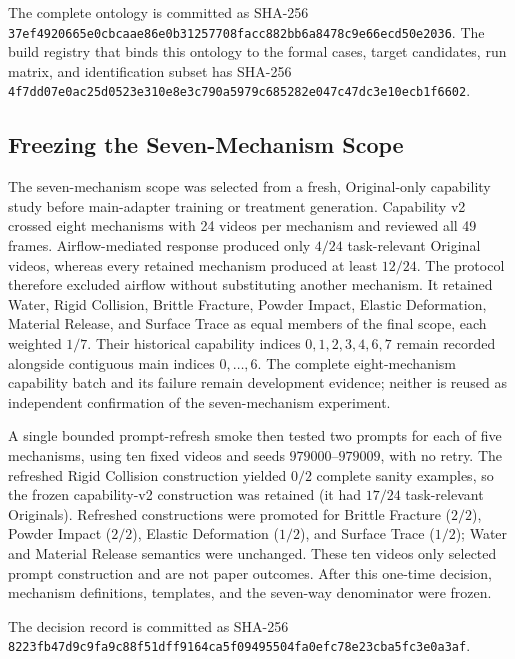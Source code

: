 {\footnotesize The complete ontology is committed as SHA-256
\texttt{37ef4920\allowbreak{}665e0cbc\allowbreak{}aae86e0b\allowbreak{}31257708\allowbreak{}facc882b\allowbreak{}b6a8478c\allowbreak{}9e66ecd5\allowbreak{}0e2036}.
The build registry that binds this ontology to the formal cases, target
candidates, run matrix, and identification subset has SHA-256
\texttt{4f7dd07e\allowbreak{}0ac25d05\allowbreak{}23e310e8\allowbreak{}e3c790a5\allowbreak{}979c6852\allowbreak{}82e047c4\allowbreak{}7dc3e10e\allowbreak{}cb1f6602}.\par}

\subsection{Freezing the Seven-Mechanism Scope}
\label{app:scope-freeze}

The seven-mechanism scope was selected from a fresh, Original-only capability
study before main-adapter training or treatment generation.  Capability v2
crossed eight mechanisms with 24 videos per mechanism and reviewed all 49
frames.  Airflow-mediated response produced only \(4/24\) task-relevant
Original videos, whereas every retained mechanism produced at least \(12/24\).
The protocol therefore excluded airflow without substituting another
mechanism.  It retained Water, Rigid Collision, Brittle Fracture, Powder
Impact, Elastic Deformation, Material Release, and Surface Trace as equal
members of the final scope, each weighted \(1/7\).  Their historical capability
indices \(0,1,2,3,4,6,7\) remain recorded alongside contiguous main indices
\(0,\ldots,6\).  The complete eight-mechanism capability batch and its failure
remain development evidence; neither is reused as independent confirmation of
the seven-mechanism experiment.

A single bounded prompt-refresh smoke then tested two prompts for each of five
mechanisms, using ten fixed videos and seeds \(979000\)--\(979009\), with no
retry.  The refreshed Rigid Collision construction yielded \(0/2\) complete
sanity examples, so the frozen capability-v2 construction was retained (it had
\(17/24\) task-relevant Originals).  Refreshed constructions were promoted for
Brittle Fracture (\(2/2\)), Powder Impact (\(2/2\)), Elastic Deformation
(\(1/2\)), and Surface Trace (\(1/2\)); Water and Material Release semantics
were unchanged.  These ten videos only selected prompt construction and are
not paper outcomes.  After this one-time decision, mechanism definitions,
templates, and the seven-way denominator were frozen.  {\footnotesize The decision record is
committed as SHA-256
\texttt{8223fb47\allowbreak{}d9c9fa9c\allowbreak{}88f51dff\allowbreak{}9164ca5f\allowbreak{}09495504\allowbreak{}fa0efc78\allowbreak{}e23cba5f\allowbreak{}c3e0a3af}.\par}

